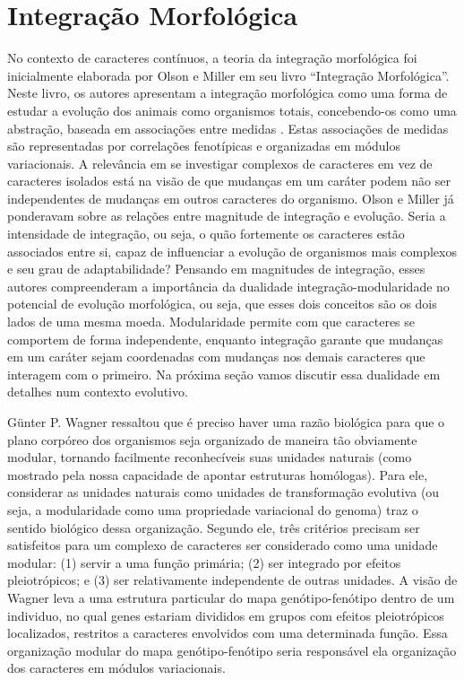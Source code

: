 \documentclass[portuges,]{tufte-handout}
\begin{document}
\section{Integração Morfológica}\label{integrauxe7uxe3o-morfoluxf3gica}

No contexto de caracteres contínuos, a teoria da integração morfológica
foi inicialmente elaborada por Olson e Miller \cite{Olson1958} em
seu livro ``Integração Morfológica''. Neste livro, os autores apresentam
a integração morfológica como uma forma de estudar a evolução dos
animais como organismos totais, concebendo-os como uma abstração,
baseada em associações entre medidas \cite{Olson1958}. Estas
associações de medidas são representadas por correlações fenotípicas e
organizadas em módulos variacionais. A relevância em se investigar
complexos de caracteres em vez de caracteres isolados está na visão de
que mudanças em um caráter podem não ser independentes de mudanças em
outros caracteres do organismo. Olson e Miller já ponderavam sobre as
relações entre magnitude de integração e evolução. Seria a intensidade
de integração, ou seja, o quão fortemente os caracteres estão associados
entre si, capaz de influenciar a evolução de organismos mais complexos e
seu grau de adaptabilidade? Pensando em magnitudes de integração, esses
autores compreenderam a importância da dualidade integração-modularidade
no potencial de evolução morfológica, ou seja, que esses dois conceitos
são os dois lados de uma mesma moeda. Modularidade permite com que
caracteres se comportem de forma independente, enquanto integração
garante que mudanças em um caráter sejam coordenadas com mudanças nos
demais caracteres que interagem com o primeiro. Na próxima seção vamos
discutir essa dualidade em detalhes num contexto evolutivo.

Günter P. Wagner \cite{Wagner1996} ressaltou que é preciso haver uma
razão biológica para que o plano corpóreo dos organismos seja organizado
de maneira tão obviamente modular, tornando facilmente reconhecíveis
suas unidades naturais (como mostrado pela nossa capacidade de apontar
estruturas homólogas). Para ele, considerar as unidades naturais como
unidades de transformação evolutiva (ou seja, a modularidade como uma
propriedade variacional do genoma) traz o sentido biológico dessa
organização. Segundo ele, três critérios precisam ser satisfeitos para
um complexo de caracteres ser considerado como uma unidade modular: (1)
servir a uma função primária; (2) ser integrado por efeitos
pleiotrópicos; e (3) ser relativamente independente de outras unidades.
A visão de Wagner leva a uma estrutura particular do mapa
genótipo-fenótipo dentro de um individuo, no qual genes estariam
divididos em grupos com efeitos pleiotrópicos localizados, restritos a
caracteres envolvidos com uma determinada função. Essa organização
modular do mapa genótipo-fenótipo seria responsável ela organização dos
caracteres em módulos variacionais.
\end{document}
